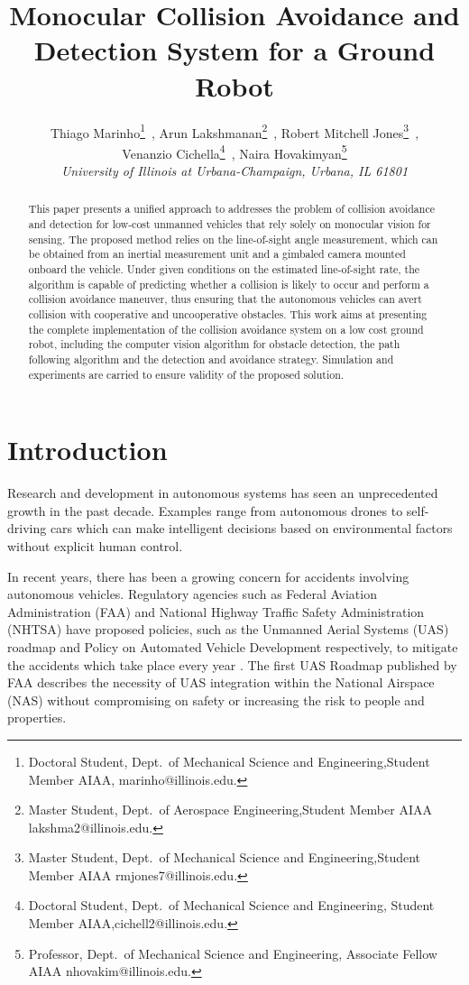 \documentclass[]{aiaa-tc}%
\title{Monocular Collision Avoidance and Detection System for a Ground Robot}
\author{
   Thiago Marinho\thanks{Doctoral Student, Dept.\ of Mechanical Science and Engineering,Student Member AIAA, marinho@illinois.edu.}~,
   Arun Lakshmanan\thanks{Master Student, Dept.\ of Aerospace Engineering,Student Member AIAA lakshma2@illinois.edu.}~,
   Robert Mitchell Jones\thanks{Master Student,  Dept.\ of Mechanical Science and Engineering,Student Member AIAA rmjones7@illinois.edu.}~,\\
    Venanzio Cichella\thanks{Doctoral Student, Dept.\ of Mechanical Science and Engineering, Student Member AIAA,cichell2@illinois.edu.}~,
    Naira Hovakimyan\thanks{Professor, Dept.\ of Mechanical Science and Engineering, Associate Fellow AIAA
    nhovakim@illinois.edu.}\\
    {\normalsize\itshape University of Illinois at Urbana-Champaign, Urbana, IL 61801}
}
\begin{document}
\maketitle

\begin{abstract}

This paper presents a unified approach to addresses the problem of collision avoidance and detection for low-cost unmanned vehicles that rely solely on monocular vision for sensing. The proposed method relies on the line-of-sight angle measurement, which can be obtained from an inertial measurement unit and a gimbaled camera mounted onboard the vehicle. Under given conditions on the estimated line-of-sight rate, the algorithm is capable of predicting whether a collision is likely to occur and perform a collision avoidance maneuver, thus ensuring that the autonomous vehicles can avert collision with cooperative and uncooperative obstacles. This work aims at presenting the complete implementation of the collision avoidance system on a low cost ground robot, including the computer vision algorithm for obstacle detection, the path following algorithm and the detection and avoidance strategy. Simulation and experiments are carried to ensure validity of the proposed solution.
\end{abstract}



\section{Introduction}
\label{sec:Introduction}
Research and development in autonomous systems  has seen an unprecedented growth in the past decade. Examples range from autonomous drones to self-driving cars which can make intelligent decisions based on environmental factors without explicit human control.

In recent years, there has been a growing concern for accidents involving autonomous vehicles. Regulatory agencies such as Federal Aviation Administration (FAA) and National Highway Traffic Safety Administration (NHTSA) have proposed policies, such as the Unmanned Aerial Systems (UAS) roadmap \cite{FAA_UAS} and Policy on Automated Vehicle Development \cite{autodev2014} respectively, to mitigate the accidents which take place every year \cite{FAAaccd2010}. The first UAS Roadmap published by FAA describes the necessity of UAS integration within the National Airspace (NAS) without compromising on safety or increasing the risk to people and properties.
\end{document}
